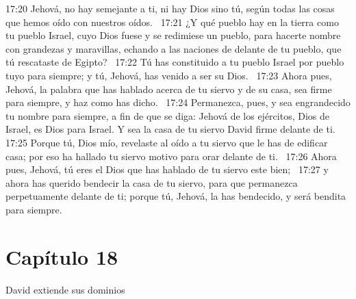17:20 Jehová, no hay semejante a ti, ni hay Dios sino tú, según todas las cosas que hemos oído con nuestros oídos.  
17:21 ¿Y qué pueblo hay en la tierra como tu pueblo Israel, cuyo Dios fuese y se redimiese un pueblo, para hacerte nombre con grandezas y maravillas, echando a las naciones de delante de tu pueblo, que tú rescataste de Egipto?  
17:22 Tú has constituido a tu pueblo Israel por pueblo tuyo para siempre; y tú, Jehová, has venido a ser su Dios.  
17:23 Ahora pues, Jehová, la palabra que has hablado acerca de tu siervo y de su casa, sea firme para siempre, y haz como has dicho.  
17:24 Permanezca, pues, y sea engrandecido tu nombre para siempre, a fin de que se diga: Jehová de los ejércitos, Dios de Israel, es Dios para Israel. Y sea la casa de tu siervo David firme delante de ti.  
17:25 Porque tú, Dios mío, revelaste al oído a tu siervo que le has de edificar casa; por eso ha hallado tu siervo motivo para orar delante de ti.  
17:26 Ahora pues, Jehová, tú eres el Dios que has hablado de tu siervo este bien;  
17:27 y ahora has querido bendecir la casa de tu siervo, para que permanezca perpetuamente delante de ti; porque tú, Jehová, la has bendecido, y será bendita para siempre.  
\section*{Capítulo 18}
David extiende sus dominios   

